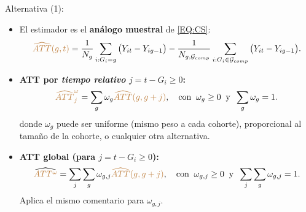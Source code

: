 \documentclass[10pt, xcolor=dvipsnames]{beamer}
\begin{document}
\begin{frame}{Alternativa (1): \citet{callaway_difference--differences_2020}}
\begin{itemize}\setlength{\itemsep}{1em}
    \item El estimador es el \textbf{análogo muestral} de \eqref{EQ:CS}:
    {\small
    \[
    \textcolor{brown}{\widehat{ATT}(g,t)} = \frac{1}{N_g}\sum_{i:G_i=g}\big(Y_{it}-Y_{ig-1}\big) - 
    \frac{1}{N_{g,\mathcal{G}_{comp}}}\sum_{i:G_i\in\mathcal{G}_{comp}}\big(Y_{it}-Y_{ig-1}\big).
    \]
    }
    \vspace{-1em}
    \item \textbf{ATT por \emph{tiempo relativo} \(j=t-G_i \geq 0\):}
    \begin{align*}
        \textcolor{brown}{\widehat{ATT}_j^{\omega}} = \sum_{g} \omega_g \textcolor{brown}{\widehat{ATT}(g,g + j)}, \quad \text{con} \;\; \omega_g \geq 0 \;\; \text{y} \;\; \sum_g \omega_g = 1.
    \end{align*}
    donde \(\omega_g\) puede ser uniforme (mismo peso a cada cohorte), proporcional al tamaño de la cohorte, o cualquier otra alternativa.    
    \item \textbf{ATT global (para \(j=t-G_i \geq 0\)):}
    \begin{align*}
        \widehat{\textcolor{brown}{ATT^{\omega}}} = \sum_{j} \sum_g \omega_{g,j} \textcolor{brown}{\widehat{ATT}(g,g + j)}, \quad \text{con} \;\; \omega_{g,j} \geq 0 \;\; \text{y} \;\; \sum_j \sum_g \omega_{g,j} = 1.
    \end{align*}
    \vspace{-0.5em}
    Aplica el mismo comentario para \(\omega_{g,j}\).
\end{itemize}
\end{frame}
\end{document}
